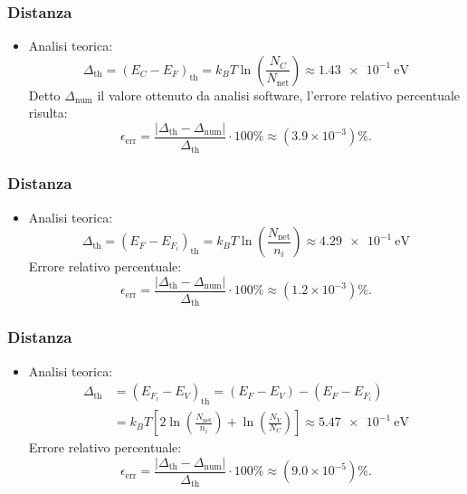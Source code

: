 \documentclass[a4paper,11pt]{report}
\begin{document}
\subsubsection{Distanza } 
\begin{itemize}
\item Analisi teorica:
	\begin{equation}
		\Delta_{\text{th}} = (E_C - E_F)_{\text{th}} = k_BT \ln\left( \frac{N_C}{N_{\text{net}}} \right) \approx \SI{1.43e-1}{\electronvolt}
	\end{equation}
	Detto $\Delta_{\text{num}}$ il valore ottenuto da analisi software, l'errore relativo percentuale risulta:
	\begin{equation}
\epsilon_{\text{err}} = \frac{|\Delta_{\text{th}}-\Delta_{\text{num}}|}{\Delta_{\text{th}}} \cdot 100 \% \approx (3.9 \times 10^{-3}) \%.
	\end{equation}
\end{itemize}

\subsubsection{Distanza } 
\begin{itemize}
\item Analisi teorica:
	\begin{equation}
		\Delta_{\text{th}} = (E_F - E_{F_i})_{\text{th}} = k_BT \ln\left( \frac{N_{\text{net}}}{n_i} \right) \approx \SI{4.29e-1}{\electronvolt}
	\end{equation}
	Errore relativo percentuale:
	\begin{equation}
\epsilon_{\text{err}} = \frac{|\Delta_{\text{th}}-\Delta_{\text{num}}|}{\Delta_{\text{th}}} \cdot 100 \% \approx (1.2 \times 10^{-3}) \%.
	\end{equation}
\end{itemize}

\subsubsection{Distanza } 
\begin{itemize}
\item Analisi teorica:
	\begin{equation}
    \begin{split} %
        \Delta_{\text{th}} &= (E_{F_i} - E_V)_{\text{th}} = (E_F-E_V)-(E_F - E_{F_i}) \\
                           &= k_BT \left[2\ln\left( \frac{N_{\text{net}}}{n_i} \right) + \ln\left( \frac{N_V}{N_C} \right)\right] \approx \SI{5.47e-1}{\electronvolt}
    \end{split}
    \end{equation}
	Errore relativo percentuale:
	\begin{equation}
\epsilon_{\text{err}} = \frac{|\Delta_{\text{th}}-\Delta_{\text{num}}|}{\Delta_{\text{th}}} \cdot 100 \% \approx (9.0 \times 10^{-5}) \%.
	\end{equation}
\end{itemize}
\end{document}
